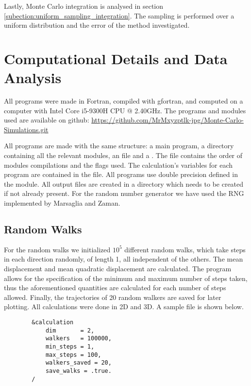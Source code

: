 Lastly, Monte Carlo integration is analysed in section \ref{subection:uniform_sampling_integration}. The sampling is performed over a uniform distribution and the error of the method investigated.

\section{Computational Details and Data Analysis}

All programs were made in Fortran, compiled with gfortran, and computed on a computer with Intel Core i5-9300H CPU @ 2.40GHz. The programs and modules used are available on github: \href{https://github.com/MrMxyzptlk-jpg/Monte-Carlo-Simulations.git}{https://github.com/MrMxyzptlk-jpg/Monte-Carlo-Simulations.git}

All programs are made with the same structure: a main program, a  directory containing all the relevant modules, an  file and a . The  file contains the order of modules compilations and the flags used. The calculation's variables for each program are contained in the  file. All programs use double precision defined in the  module. All output files are created in a  directory which needs to be created if not already present. For the random number generator we have used the RNG implemented by  Marsaglia and Zaman\cite{MZ-paper}.

\subsection{Random Walks}
\label{subection:random_walk}

For the random walks we initialized $10^5$ different random walks, which take steps in each direction randomly, of length 1, all independent of the others. The mean displacement and mean quadratic displacement are calculated. The program allows for the specification of the minimum and maximum number of steps taken, thus the aforementioned quantities are calculated for each number of steps allowed. Finally, the trajectories of 20 random walkers are saved for later plotting. All calculations were done in 2D and 3D. A sample  file is shown below.

    \begin{tcolorbox}[
        boxrule=0pt,
        sharp corners
    ]
        \begin{lstlisting}
        &calculation
            dim       = 2,
            walkers   = 100000,
            min_steps = 1,
            max_steps = 100,
            walkers_saved = 20,
            save_walks = .true.
        /
        \end{lstlisting}
    \end{tcolorbox}


